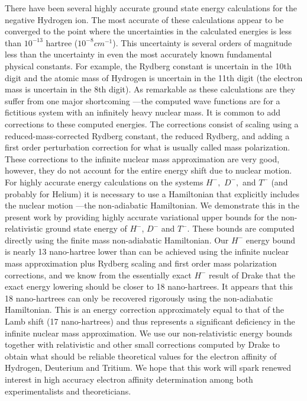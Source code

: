 \documentclass[12pt,thmsa]{article}
\begin{document}
There have been several highly accurate ground state energy calculations for
the negative Hydrogen ion\cite
{Pekeris62,Frankowski66,Drake88,Baker90,Thakkar94,Ackermann95}. The most
accurate of these calculations\cite{Drake88,Baker90,Thakkar94} appear to be
converged to the point where the uncertainties in the calculated energies is
less than $10^{-13}$ hartree ($10^{-8}cm^{-1}$). This uncertainty is several
orders of magnitude less than the uncertainty in even the most accurately
known fundamental physical constants. For example, the Rydberg constant is
uncertain in the 10th digit\cite{Petley92} and the atomic mass of Hydrogen
is uncertain in the 11th digit\cite{Audi93} (the electron mass is uncertain
in the 8th digit\cite{Audi93}). As remarkable as these calculations are they
suffer from one major shortcoming ---the computed wave functions are for a
fictitious system with an infinitely heavy nuclear mass. It is common to add
corrections to these computed energies. The corrections consist of scaling
using a reduced-mass-corrected Rydberg constant, the reduced Rydberg, and
adding a first order perturbation correction for what is usually called mass
polarization\cite{BetheSalpeter}. These corrections to the infinite nuclear
mass approximation are very good, however, they do not account for the
entire energy shift due to nuclear motion. For highly accurate energy
calculations on the systems $H^{-},\,\,D^{-},\,\,$and $T^{-}$ (and probably
for Helium) it is necessary to use a Hamiltonian that explicitly includes
the nuclear motion ---the non-adiabatic Hamiltonian. We demonstrate this in
the present work by providing highly accurate variational upper bounds for
the non-relativistic ground state energy of $H^{-}$, $D^{-}$ and $T^{-}.$
These bounds are computed directly using the finite mass non-adiabatic
Hamiltonian. Our $H^{-}$ energy bound is nearly 13 nano-hartree lower than
can be achieved using the infinite nuclear mass approximation plus Rydberg
scaling and first order mass polarization corrections, and we know from the
essentially exact $H^{-}$ result of Drake\cite{Drake88} that the exact
energy lowering should be closer to 18 nano-hartrees. It appears that this
18 nano-hartrees can only be recovered rigorously using the non-adiabatic
Hamiltonian. This is an energy correction approximately equal to that of the
Lamb shift (17 nano-hartrees\cite{Drake88}) and thus represents a
significant deficiency in the infinite nuclear mass approximation. We use
our non-relativistic energy bounds together with relativistic and other
small corrections computed by Drake\cite{Drake88} to obtain what should be
reliable theoretical values for the electron affinity of Hydrogen, Deuterium
and Tritium. We hope that this work will spark renewed interest in high
accuracy electron affinity determination among both experimentalists and
theoreticians.
\end{document}

